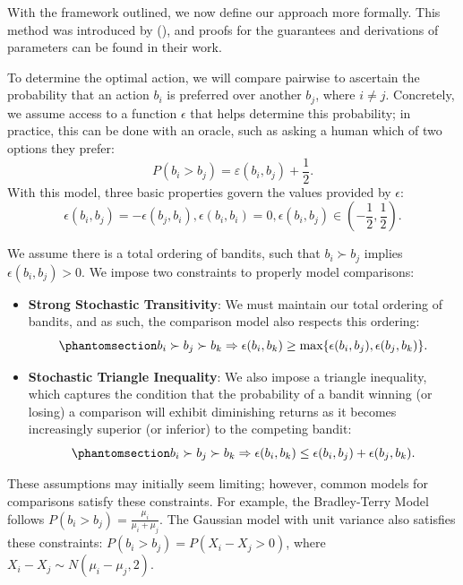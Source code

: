 \documentclass[
  letterpaper,
  numbers=noenddot,
  DIV=11]{scrreprt}
\theoremstyle{plain}
\theoremstyle{definition}
\theoremstyle{plain}
\theoremstyle{remark}
\begin{document}
With the framework outlined, we now define our approach more formally.
This method was introduced by (), and proofs for the guarantees and derivations of parameters can
be found in their work.

To determine the optimal action, we will compare pairwise to ascertain
the probability that an action \(b_i\) is preferred over another
\(b_j\), where \(i \ne j\). Concretely, we assume access to a function
\(\epsilon\) that helps determine this probability; in practice, this
can be done with an oracle, such as asking a human which of two options
they prefer: \[P(b_i > b_j) = \varepsilon(b_i, b_j) + \frac{1}{2}.\]
With this model, three basic properties govern the values provided by
\(\epsilon\):
\[\epsilon(b_i, b_j) = -\epsilon(b_j, b_i), \epsilon(b_i, b_i) = 0, \epsilon(b_i, b_j) \in \left(-\frac{1}{2}, \frac{1}{2} \right).\]

We assume there is a total ordering of bandits, such that
\(b_i \succ b_j\) implies \(\epsilon(b_i, b_j) > 0\). We impose two
constraints to properly model comparisons:

\begin{itemize}
\item
  \textbf{Strong Stochastic Transitivity}: We must maintain our total
  ordering of bandits, and as such, the comparison model also respects
  this ordering:
  \begin{equation}\phantomsection\label{eq-stochastic-transitivity}{b_i \succ b_j \succ b_k \Rightarrow \epsilon(b_i, b_k) \ge \text{max}\{\epsilon(b_i, b_j), \epsilon(b_j, b_k)\}.}\end{equation}
\item
  \textbf{Stochastic Triangle Inequality}: We also impose a triangle
  inequality, which captures the condition that the probability of a
  bandit winning (or losing) a comparison will exhibit diminishing
  returns as it becomes increasingly superior (or inferior) to the
  competing bandit:
  \begin{equation}\phantomsection\label{eq-triangle-inequality}{b_i \succ b_j \succ b_k \Rightarrow \epsilon(b_i, b_k) \le \epsilon(b_i, b_j) + \epsilon(b_j, b_k).}\end{equation}
\end{itemize}

These assumptions may initially seem limiting; however, common models
for comparisons satisfy these constraints. For example, the
Bradley-Terry Model follows
\(P(b_i > b_j) = \frac{\mu_i}{\mu_i + \mu_j}\). The Gaussian model with
unit variance also satisfies these constraints:
\(P(b_i > b_j) = P(X_i - X_j > 0)\), where
\(X_i - X_j \sim N(\mu_i - \mu_j, 2)\).
\end{document}
